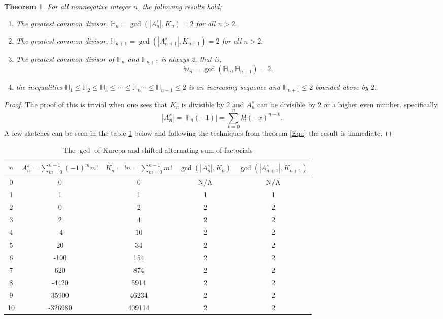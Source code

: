 \documentclass[pdflatex,sn-mathphys-num]{sn-jnl}%
\newtheorem{theorem}{Theorem}
\theoremstyle{thmstyleone}%
\theoremstyle{thmstyletwo}%
\theoremstyle{thmstylethree}%
\begin{document}
\begin{theorem}
For all nonnegative integer $n$, the following results hold;
  \begin{enumerate}
      \item [(i)] The greatest common divisor, $\mathbb{H}_n=\gcd( |A_{n}^s|, K_n)=2$ for all $n>2.$
      \item[(ii)] The greatest common divisor, $\mathbb{H}_{n+1}=\gcd( |A_{n+1}^s|, K_{n+1})=2$ for all $n>2.$
      \item [(iii)] The greatest common divisor of $\mathbb{H}_n$ and $\mathbb{H}_{n+1}$ is always 2, that is, $$\mathbb{W}_n=\gcd(\mathbb{H}_{n}, \mathbb{H}_{n+1})=2.$$
    \item [(iv)] the inequalities $\mathbb{H}_1\leq \mathbb{H}_2\leq \mathbb{H}_3\leq \cdots \leq \mathbb{H}_n\cdots\leq \mathbb{H}_{n+1}\leq 2$ is an increasing sequence and $\mathbb{H}_{n+1}\leq 2$ bounded above by $2$.
  \end{enumerate}  
\end{theorem}
\begin{proof}
    The proof of this is trivial when one sees that $K_n$ is divisible by $2$ and $A_{n}^s$ can be divisible by $2$ or a higher even number. specifically, $$|A_{n}^s|=|\mathbb{F}_{n}(-1)|= \sum_{k=0}^n k!(-x)^{n-k}.$$ A few sketches can be seen in the table \ref{table 9} below and following the techniques from theorem \ref{Equ} the result is immediate.
\end{proof}



\begin{table}[!ht]\label{other}
\centering
\begin{tabular}{|c|c|c|c|c|}\hline
$n$ & $A_n^s = \sum_{m=0}^{n-1} (-1)^m m!$ & $K_n =!n= \sum_{m=0}^{n-1} m!$ & $\gcd( |A_{n}^s|, K_n)$ &$\gcd( |A_{n+1}^s|, K_{n+1})$\\
\hline
0 & 0 & 0 & N/A& N/A\\
1 & 1 & 1 & 1 & 1\\ \rowcolor{LightCyan}
2 & 0 & 2 & 2 & 2\\ 
3 & 2 & 4 & 2&2 \\
4 & -4 & 10 & 2& 2\\
5 & 20 & 34 & 2& 2\\
6 & -100 & 154& 2& 2\\
7 & 620 & 874& 2& 2 \\
8 & -4420 & 5914 & 2& 2 \\
9 & 35900 & 46234& 2 & 2\\
10 & -326980 & 409114& 2 & 2\\
\hline
\end{tabular}
  \caption{The $\gcd$ of Kurepa and shifted alternating sum of factorials}
    \label{table 9}
\end{table}
\end{document}
